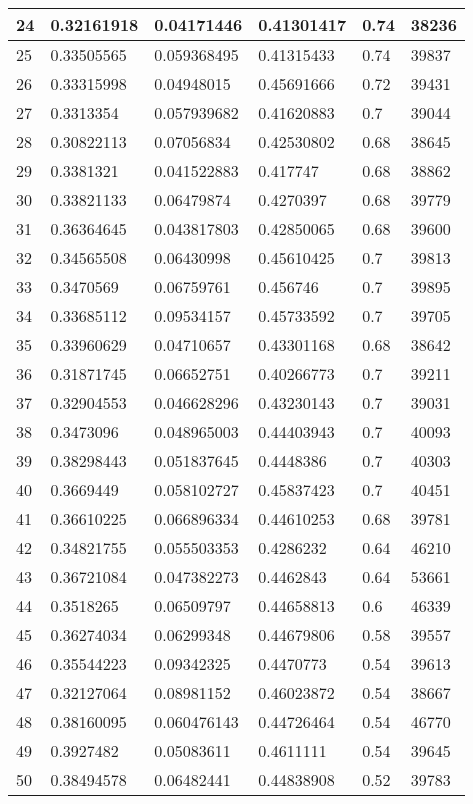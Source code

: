 \begin{longtable}{|l|l|l|l|l|l|}
24 & 0.32161918 & 0.04171446 & 0.41301417 & 0.74 & 38236 \\ \hline 
25 & 0.33505565 & 0.059368495 & 0.41315433 & 0.74 & 39837 \\ \hline 
26 & 0.33315998 & 0.04948015 & 0.45691666 & 0.72 & 39431 \\ \hline 
27 & 0.3313354 & 0.057939682 & 0.41620883 & 0.7 & 39044 \\ \hline 
28 & 0.30822113 & 0.07056834 & 0.42530802 & 0.68 & 38645 \\ \hline 
29 & 0.3381321 & 0.041522883 & 0.417747 & 0.68 & 38862 \\ \hline 
30 & 0.33821133 & 0.06479874 & 0.4270397 & 0.68 & 39779 \\ \hline 
31 & 0.36364645 & 0.043817803 & 0.42850065 & 0.68 & 39600 \\ \hline 
32 & 0.34565508 & 0.06430998 & 0.45610425 & 0.7 & 39813 \\ \hline 
33 & 0.3470569 & 0.06759761 & 0.456746 & 0.7 & 39895 \\ \hline 
34 & 0.33685112 & 0.09534157 & 0.45733592 & 0.7 & 39705 \\ \hline 
35 & 0.33960629 & 0.04710657 & 0.43301168 & 0.68 & 38642 \\ \hline 
36 & 0.31871745 & 0.06652751 & 0.40266773 & 0.7 & 39211 \\ \hline 
37 & 0.32904553 & 0.046628296 & 0.43230143 & 0.7 & 39031 \\ \hline 
38 & 0.3473096 & 0.048965003 & 0.44403943 & 0.7 & 40093 \\ \hline 
39 & 0.38298443 & 0.051837645 & 0.4448386 & 0.7 & 40303 \\ \hline 
40 & 0.3669449 & 0.058102727 & 0.45837423 & 0.7 & 40451 \\ \hline 
41 & 0.36610225 & 0.066896334 & 0.44610253 & 0.68 & 39781 \\ \hline 
42 & 0.34821755 & 0.055503353 & 0.4286232 & 0.64 & 46210 \\ \hline 
43 & 0.36721084 & 0.047382273 & 0.4462843 & 0.64 & 53661 \\ \hline 
44 & 0.3518265 & 0.06509797 & 0.44658813 & 0.6 & 46339 \\ \hline 
45 & 0.36274034 & 0.06299348 & 0.44679806 & 0.58 & 39557 \\ \hline 
46 & 0.35544223 & 0.09342325 & 0.4470773 & 0.54 & 39613 \\ \hline 
47 & 0.32127064 & 0.08981152 & 0.46023872 & 0.54 & 38667 \\ \hline 
48 & 0.38160095 & 0.060476143 & 0.44726464 & 0.54 & 46770 \\ \hline 
49 & 0.3927482 & 0.05083611 & 0.4611111 & 0.54 & 39645 \\ \hline 
50 & 0.38494578 & 0.06482441 & 0.44838908 & 0.52 & 39783 \\ \hline 
\end{longtable}